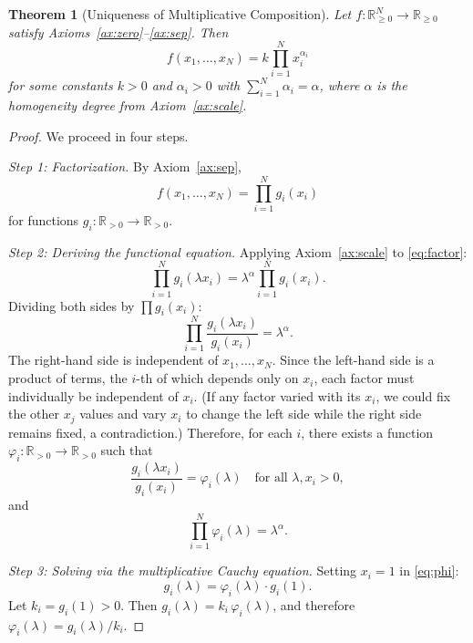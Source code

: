 \documentclass[12pt, a4paper]{article}
\newtheorem{theorem}{Theorem}[section]
\theoremstyle{definition}
\theoremstyle{remark}
\newcommand{\Rp}{\mathbb{R}_{>0}}
\newcommand{\Rnn}{\mathbb{R}_{\geq 0}}
\begin{document}
\begin{theorem}[Uniqueness of Multiplicative Composition]\label{thm:main}
Let $f: \Rnn^N \to \Rnn$ satisfy Axioms~\ref{ax:zero}--\ref{ax:sep}. Then
\[
f(x_1, \ldots, x_N) = k \prod_{i=1}^{N} x_i^{\alpha_i}
\]
for some constants $k > 0$ and $\alpha_i > 0$ with $\sum_{i=1}^{N} \alpha_i = \alpha$, where $\alpha$ is the homogeneity degree from Axiom~\ref{ax:scale}.
\end{theorem}

\begin{proof}
We proceed in four steps.

\medskip
\noindent\textit{Step 1: Factorization.} By Axiom~\ref{ax:sep},
\begin{equation}\label{eq:factor}
f(x_1, \ldots, x_N) = \prod_{i=1}^{N} g_i(x_i)
\end{equation}
for functions $g_i : \Rp \to \Rp$.

\medskip
\noindent\textit{Step 2: Deriving the functional equation.} Applying Axiom~\ref{ax:scale} to \eqref{eq:factor}:
\[
\prod_{i=1}^{N} g_i(\lambda x_i) = \lambda^\alpha \prod_{i=1}^{N} g_i(x_i).
\]
Dividing both sides by $\prod g_i(x_i)$:
\begin{equation}\label{eq:ratio}
\prod_{i=1}^{N} \frac{g_i(\lambda x_i)}{g_i(x_i)} = \lambda^\alpha.
\end{equation}
The right-hand side is independent of $x_1, \ldots, x_N$. Since the left-hand side is a product of terms, the $i$-th of which depends only on $x_i$, each factor must individually be independent of $x_i$. (If any factor varied with its $x_i$, we could fix the other $x_j$ values and vary $x_i$ to change the left side while the right side remains fixed, a contradiction.) Therefore, for each $i$, there exists a function $\varphi_i : \Rp \to \Rp$ such that
\begin{equation}\label{eq:phi}
\frac{g_i(\lambda x_i)}{g_i(x_i)} = \varphi_i(\lambda) \quad \text{for all } \lambda, x_i > 0,
\end{equation}
and
\begin{equation}\label{eq:phiprod}
\prod_{i=1}^{N} \varphi_i(\lambda) = \lambda^\alpha.
\end{equation}

\medskip
\noindent\textit{Step 3: Solving via the multiplicative Cauchy equation.} Setting $x_i = 1$ in \eqref{eq:phi}:
\[
g_i(\lambda) = \varphi_i(\lambda) \cdot g_i(1).
\]
Let $k_i = g_i(1) > 0$. Then $g_i(\lambda) = k_i \, \varphi_i(\lambda)$, and therefore $\varphi_i(\lambda) = g_i(\lambda)/k_i$.


\end{proof}
\end{document}
